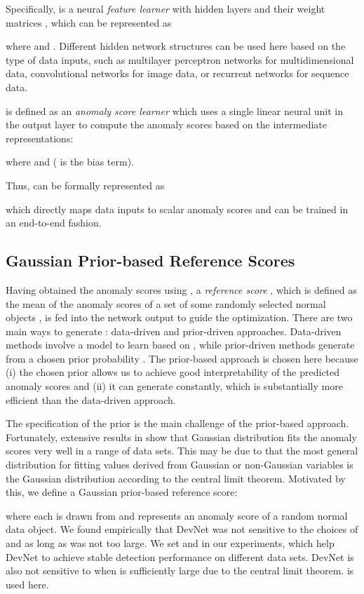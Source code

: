 \documentclass[sigconf]{acmart}
\begin{document}
Specifically,  is a neural \textit{feature learner} with  hidden layers and their weight matrices , which can be represented as

where  and . Different hidden network structures can be used here based on the type of data inputs, such as multilayer perceptron networks for multidimensional data, convolutional networks for image data, or recurrent networks for sequence data. 

 is defined as an \textit{anomaly score learner} which uses a single linear neural unit in the output layer to compute the anomaly scores based on the intermediate representations:


where  and  ( is the bias term).


Thus,  can be formally represented as 

which directly maps data inputs to scalar anomaly scores and can be trained in an end-to-end fashion.

\subsection{Gaussian Prior-based Reference Scores}\label{sec:reference}

Having obtained the anomaly scores using , a \textit{reference score} , which is defined as the mean of the anomaly scores of a set of some randomly selected normal objects , is fed into the network output to guide the optimization. There are two main ways to generate : data-driven and prior-driven approaches. Data-driven methods involve a model to learn  based on , while prior-driven methods generate  from a chosen prior probability . The prior-based approach is chosen here because (i) the chosen prior allows us to achieve good interpretability of the predicted anomaly scores and (ii) it can generate  constantly, which is substantially more efficient than the data-driven approach.

The specification of the prior is the main challenge of the prior-based approach. Fortunately, extensive results in \cite{kriegel2011interpreting} show that Gaussian distribution fits the anomaly scores very well in a range of data sets. This may be due to that the most general distribution for fitting values derived from Gaussian or non-Gaussian variables is the Gaussian distribution according to the central limit theorem. Motivated by this, we define a Gaussian prior-based reference score:

where each  is drawn from  and represents an anomaly score of a random normal data object. We found empirically that DevNet was not sensitive to the choices of  and  as long as  was not too large. We set  and  in our experiments, which help DevNet to achieve stable detection performance on different data sets. DevNet is also not sensitive to  when  is sufficiently large due to the central limit theorem.  is used here. 
\end{document}
